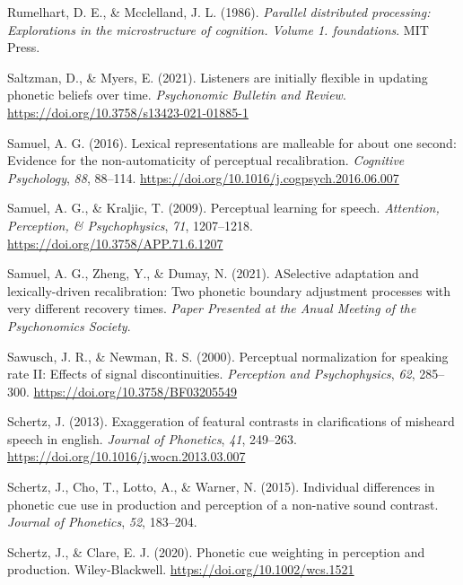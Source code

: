\documentclass[
  11pt,
  english,
  man,floatsintext]{apa6}
\newlength{\cslhangindent}
\newlength{\cslentryspacingunit} %
\newenvironment{CSLReferences}[2] %
 {%
  \setlength{\parindent}{0pt}
  \ifodd #1
  \let\oldpar\par
  \def\par{\hangindent=\cslhangindent\oldpar}
  \fi
  \setlength{\parskip}{#2\cslentryspacingunit}
 }%
 {}
\begin{document}
\begin{CSLReferences}{1}{0}
\leavevmode{}%
Rumelhart, D. E., \& Mcclelland, J. L. (1986). \emph{Parallel distributed processing: Explorations in the microstructure of cognition. Volume 1. foundations}. MIT Press.

\leavevmode{}%
Saltzman, D., \& Myers, E. (2021). Listeners are initially flexible in updating phonetic beliefs over time. \emph{Psychonomic Bulletin and Review}. \url{https://doi.org/10.3758/s13423-021-01885-1}

\leavevmode{}%
Samuel, A. G. (2016). Lexical representations are malleable for about one second: Evidence for the non-automaticity of perceptual recalibration. \emph{Cognitive Psychology}, \emph{88}, 88--114. \url{https://doi.org/10.1016/j.cogpsych.2016.06.007}

\leavevmode{}%
Samuel, A. G., \& Kraljic, T. (2009). Perceptual learning for speech. \emph{Attention, Perception, \& Psychophysics}, \emph{71}, 1207--1218. \url{https://doi.org/10.3758/APP.71.6.1207}

\leavevmode{}%
Samuel, A. G., Zheng, Y., \& Dumay, N. (2021). ASelective adaptation and lexically-driven recalibration: Two phonetic boundary adjustment processes with very different recovery times. \emph{Paper Presented at the Anual Meeting of the Psychonomics Society}.

\leavevmode{}%
Sawusch, J. R., \& Newman, R. S. (2000). Perceptual normalization for speaking rate II: Effects of signal discontinuities. \emph{Perception and Psychophysics}, \emph{62}, 285--300. \url{https://doi.org/10.3758/BF03205549}

\leavevmode{}%
Schertz, J. (2013). Exaggeration of featural contrasts in clarifications of misheard speech in english. \emph{Journal of Phonetics}, \emph{41}, 249--263. \url{https://doi.org/10.1016/j.wocn.2013.03.007}

\leavevmode{}%
Schertz, J., Cho, T., Lotto, A., \& Warner, N. (2015). Individual differences in phonetic cue use in production and perception of a non-native sound contrast. \emph{Journal of Phonetics}, \emph{52}, 183--204.

\leavevmode{}%
Schertz, J., \& Clare, E. J. (2020). Phonetic cue weighting in perception and production. Wiley-Blackwell. \url{https://doi.org/10.1002/wcs.1521}


\end{CSLReferences}
\end{document}
